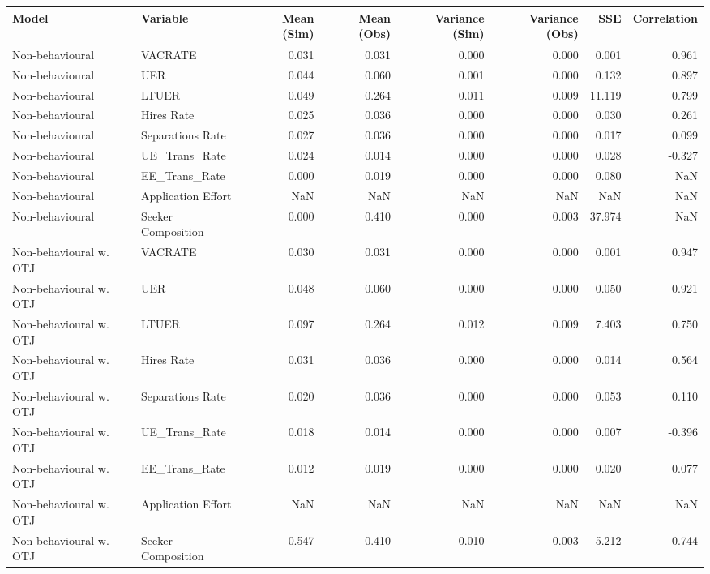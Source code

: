 \begin{table}[ht]
\centering
\begin{adjustbox}{width=\textwidth}
\begin{tabular}{llrrrrrr}
\toprule
Model & Variable & Mean (Sim) & Mean (Obs) & Variance (Sim) & Variance (Obs) & SSE & Correlation \\
\midrule
Non-behavioural & VACRATE & 0.031 & 0.031 & 0.000 & 0.000 & 0.001 & 0.961 \\
Non-behavioural & UER & 0.044 & 0.060 & 0.001 & 0.000 & 0.132 & 0.897 \\
Non-behavioural & LTUER & 0.049 & 0.264 & 0.011 & 0.009 & 11.119 & 0.799 \\
Non-behavioural & Hires Rate & 0.025 & 0.036 & 0.000 & 0.000 & 0.030 & 0.261 \\
Non-behavioural & Separations Rate & 0.027 & 0.036 & 0.000 & 0.000 & 0.017 & 0.099 \\
Non-behavioural & UE\_Trans\_Rate & 0.024 & 0.014 & 0.000 & 0.000 & 0.028 & -0.327 \\
Non-behavioural & EE\_Trans\_Rate & 0.000 & 0.019 & 0.000 & 0.000 & 0.080 & NaN \\
Non-behavioural & Application Effort & NaN & NaN & NaN & NaN & NaN & NaN \\
Non-behavioural & Seeker Composition & 0.000 & 0.410 & 0.000 & 0.003 & 37.974 & NaN \\
Non-behavioural w. OTJ & VACRATE & 0.030 & 0.031 & 0.000 & 0.000 & 0.001 & 0.947 \\
Non-behavioural w. OTJ & UER & 0.048 & 0.060 & 0.000 & 0.000 & 0.050 & 0.921 \\
Non-behavioural w. OTJ & LTUER & 0.097 & 0.264 & 0.012 & 0.009 & 7.403 & 0.750 \\
Non-behavioural w. OTJ & Hires Rate & 0.031 & 0.036 & 0.000 & 0.000 & 0.014 & 0.564 \\
Non-behavioural w. OTJ & Separations Rate & 0.020 & 0.036 & 0.000 & 0.000 & 0.053 & 0.110 \\
Non-behavioural w. OTJ & UE\_Trans\_Rate & 0.018 & 0.014 & 0.000 & 0.000 & 0.007 & -0.396 \\
Non-behavioural w. OTJ & EE\_Trans\_Rate & 0.012 & 0.019 & 0.000 & 0.000 & 0.020 & 0.077 \\
Non-behavioural w. OTJ & Application Effort & NaN & NaN & NaN & NaN & NaN & NaN \\
Non-behavioural w. OTJ & Seeker Composition & 0.547 & 0.410 & 0.010 & 0.003 & 5.212 & 0.744 \\

\end{tabular}
\end{adjustbox}
\end{table}
